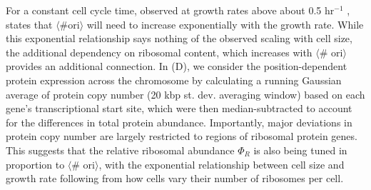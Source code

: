 For a constant cell cycle time, observed at growth rates above about 0.5
hr$^{-1}$ \citep{helmstetter1968},  states that $\langle \text{\# ori}
\rangle$ will need to increase exponentially with the growth rate. While this
exponential relationship says nothing of the observed scaling with cell size, the
additional dependency on ribosomal content, which increases with $\langle$\#
ori$\rangle$ provides an additional connection.  In (D),
we consider the position-dependent protein expression across the chromosome by
calculating a running Gaussian average of protein copy number (20 kbp st. dev.
averaging window) based on each gene's transcriptional start site, which were
then median-subtracted to account for the differences in total protein
abundance. Importantly, major deviations in protein copy number are largely
restricted to regions of ribosomal protein genes. This suggests that the
relative ribosomal abundance $\Phi_R$ is also being tuned in proportion to
$\langle$\# ori$\rangle$, with the exponential relationship between  cell size
and growth rate following from how cells vary their number of ribosomes per
cell.


